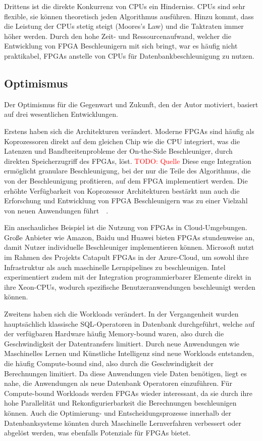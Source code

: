 \documentclass[conference]{IEEEtran}
\newcommand{\todo}[1]{\textcolor{red}{TODO: #1}}
\begin{document}
Drittens ist die direkte Konkurrenz von CPUs ein Hinderniss. CPUs sind sehr flexible, sie können theoretisch jeden Algorithmus
ausführen. Hinzu kommt, dass die Leistung der CPUs stetig steigt (Moores's Law) und die Taktraten immer höher werden. Durch den hohe
Zeit- und Ressourcenaufwand, welcher die Entwicklung von FPGA Beschleunigern mit sich bringt, war es häufig nicht praktikabel, FPGAs
anstelle von CPUs für Datenbankbeschleunigung zu nutzen.

\subsection{Optimismus}
Der Optimismus für die Gegenwart und Zukunft, den der Autor motiviert, basiert auf drei wesentlichen Entwicklungen.

Erstens haben sich die Architekturen verändert. Moderne FPGAs sind häufig als Koprozessoren direkt auf dem gleichen Chip wie die CPU integriert,
was die Latenzen und Bandbreitenprobleme der On-the-Side Beschleuniger, durch direkten Speicherzugriff des FPGAs, löst. \todo{Quelle}
Diese enge Integration ermöglicht granulare Beschleunigung, bei der nur die Teile des Algorithmus, die von der Beschleunigung profitieren,
auf dem FPGA implementiert werden. Die erhöhte Verfügbarkeit von Koprozessor Architekturen bestärkt nun auch die Erforschung und Entwicklung
von FPGA Beschleunigern was zu einer Vielzahl von neuen Anwendungen führt~\cite{lisa_column_2018}~\cite{sidler_accelerating_2017}.

Ein anschauliches Beispiel ist die Nutzung von FPGAs in Cloud-Umgebungen. Große Anbieter wie Amazon, Baidu und Huawei bieten FPGAs stundenweise an,
damit Nutzer individuelle Beschleuniger implementieren können. Microsoft nutzt im Rahmen des Projekts Catapult FPGAs in der Azure-Cloud, um sowohl ihre
Infrastruktur als auch maschinelle Lernpipelines zu beschleunigen. Intel experimentiert zudem mit der Integration programmierbarer Elemente direkt in
ihre Xeon-CPUs, wodurch spezifische Benutzeranwendungen beschleunigt werden können.


Zweitens haben sich die Workloads verändert. In der Vergangenheit wurden hauptsächlich klassische SQL-Operatoren
in Datenbank durchgeführt, welche auf der verfügbaren Hardware häufig Memory-bound waren, also durch die
Geschwindigkeit der Datentransfers limitiert. Durch neue Anwendungen wie Maschinelles Lernen und Künstliche Intelligenz
sind neue Workloads entstanden, die häufig Compute-bound sind, also durch die Geschwindigkeit der Berechnungen limitiert. Da diese Anwendungen viele Daten benötigen,
liegt es nahe, die Anwendungen als neue Datenbank Operatoren einzuführen. Für Compute-bound Workloads werden FPGAs wieder interessant, da sie durch ihre
hohe Parallelität und Rekonfigurierbarkeit die Berechnungen beschleunigen können.
Auch die Optimierung- und Entscheidungsprozesse innerhalb der Datenbanksysteme könnten durch Maschinelle Lernverfahren verbessert oder abgelöst werden, was ebenfalls
Potenziale für FPGAs bietet.
\end{document}
